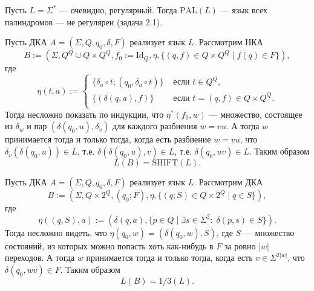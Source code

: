 \documentclass[12pt,a4paper]{article}
\newcommand{\Id}{\mathrm{Id}}
\begin{document}
    \begin{problem*}[4.3]
        Пусть $L = \Sigma^*$ --- очевидно, регулярный. Тогда $\mathrm{PAL}(L)$ --- язык всех палиндромов --- не регулярен (задача 2.1).
    \end{problem*}

    \begin{problem*}[4.4]
        Пусть ДКА $A = (\Sigma, Q, q_0, \delta, F)$ реализует язык $L$. Рассмотрим НКА
        \[B := (\Sigma, Q^Q \cup Q \times Q^Q, f_0 := \Id_Q, \eta, \{(q, f) \in Q \times Q^Q \mid f(q) \in F\}),\]
        где
        \[
            \eta(t, a) :=
            \begin{cases}
                \{\delta_a \circ t; (q_0, \delta_a \circ t)\}& \text{ если } t \in Q^Q,\\
                \{(\delta(q, a), f)\}& \text{ если } t = (q, f) \in Q \times Q^Q.\\
            \end{cases}
        \]
        Тогда несложно показать по индукции, что $\eta^*(f_0, w)$ --- множество, состоящее из $\delta_w$ и пар $(\delta(q_0, u), \delta_v)$ для каждого разбиения $w = vu$. А тогда $w$ принимается тогда и только тогда, когда есть разбиение $w = vu$, что $\delta_v(\delta(q_0, u)) \in L$, т.е. $\delta(\delta(q_0, u), v) \in L$, т.е. $\delta(q_0, uv) \in L$. Таким образом
        \[L(B) = \mathrm{SHIFT}(L).\]
    \end{problem*}

    \begin{problem*}[4.5]
        Пусть ДКА $A = (\Sigma, Q, q_0, \delta, F)$ реализует язык $L$. Рассмотрим ДКА
        \[B := (\Sigma, Q \times 2^Q, (q_0; F), \eta, \{(q; S) \in Q \times 2^Q \mid q \in S\}),\]
        где
        \[\eta((q, S), a) := (\delta(q, a), \{p \in Q \mid \exists s \in \Sigma^2 \colon\; \delta(p, s) \in S\}).\]
        Тогда несложно видеть, что $\eta(q_0, w) = (\delta(q_0, w), S)$, где $S$ --- множество состояний, из которых можно попасть хоть как-нибудь в $F$ за ровно $|w|$ переходов. А тогда $w$ принимается тогда и только тогда, когда есть $v \in \Sigma^{2|w|}$, что $\delta(q_0, wv) \in F$. Таким образом
        \[L(B) = 1/3(L).\]
    \end{problem*}
\end{document}

